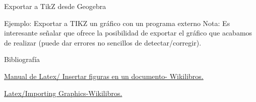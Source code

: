\documentclass{beamer}
\begin{document}
\begin{frame}{Exportar a TikZ desde Geogebra}
\begin{exampleblock}{Ejemplo: Exportar a TIKZ  un gr\'afico con un programa externo}
Nota: Es interesante se\~nalar que ofrece la posibilidad de exportar el gr\'afico
que acabamos de realizar (puede dar errores no sencillos de detectar/corregir).
\end{exampleblock}
\end{frame}






\begin{frame}[fragile]{Bibliograf\'ia}
\begin{thebibliography}{10}
 \href{http://es.wikibooks.org/wiki/Manual_de_LaTeX/Insertar_figuras_en_un_documento}{Manual de Latex/ Insertar figuras en un documento- Wikilibros.}

\href{http://en.wikibooks.org/wiki/LaTeX/Importing_Graphics}{Latex/Importing Graphics-Wikilibros.}


\end{thebibliography}
\end{frame}
\end{document}
